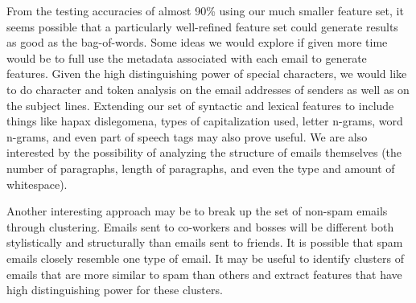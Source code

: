 \documentclass{article} %
\begin{document}
From the testing accuracies of almost 90\% using our much smaller feature set, it seems possible that a particularly well-refined feature set could generate results as good as the bag-of-words. Some ideas we would explore if given more time would be to full use the metadata associated with each email to generate features. Given the high distinguishing power of special characters, we would like to do character and token analysis on the email addresses of senders as well as on the subject lines. Extending our set of syntactic and lexical features to include things like hapax dislegomena, types of capitalization used, letter n-grams, word n-grams, and even part of speech tags may also prove useful.  We are also interested by the possibility of analyzing the structure of emails themselves (the number of paragraphs, length of paragraphs, and even the type and amount of whitespace).\cite{matthews1993neural, merriam1994neural, holmes1995federalist} \par
Another interesting approach may be to break up the set of non-spam emails through clustering. Emails sent to co-workers and bosses will be different both stylistically and structurally than emails sent to friends. It is possible that spam emails closely resemble one type of email. It may be useful to identify clusters of emails that are more similar to spam than others and extract features that have high distinguishing power for these clusters.





\end{document}
